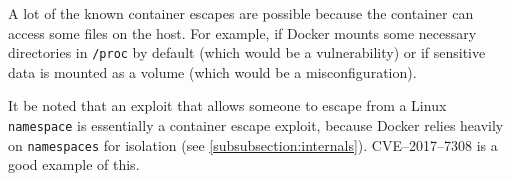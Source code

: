 \medskip

A lot of the known container escapes are possible because the container can access some files on the host. For example, if Docker mounts some necessary directories in \lstinline{/proc} by default (which would be a vulnerability) or if sensitive data is mounted as a volume (which would be a misconfiguration).

\medskip

It be noted that an exploit that allows someone to escape from a Linux \lstinline{namespace} is essentially a container escape exploit, because Docker relies heavily on \lstinline{namespaces} for isolation (see \autoref{subsubsection:internals}). CVE--2017--7308\cite{CVE-2017-7308} is a good example of this.

